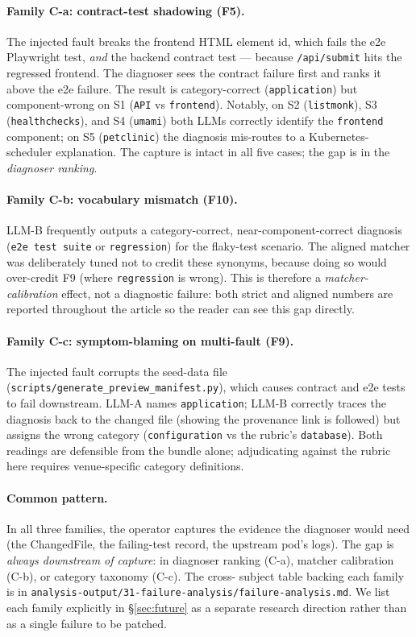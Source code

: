 \documentclass[sigconf, nonacm=true, anonymous=false, review=false]{acmart}
\newcommand{\artifactname}[1]{\nolinkurl{#1}}
\newcommand{\fn}[1]{F#1\xspace}
\begin{document}
\paragraph{Family C-a: contract-test shadowing (\fn{5}).}
The injected fault breaks the frontend HTML element id, which fails
the e2e Playwright test, \emph{and} the backend contract test —
because \texttt{/api/submit} hits the regressed frontend. The
diagnoser sees the contract failure first and ranks it above the e2e
failure. The result is category-correct (\texttt{application}) but
component-wrong on S1 (\texttt{API} vs \texttt{frontend}). Notably,
on S2 (\texttt{listmonk}), S3 (\texttt{healthchecks}), and S4
(\texttt{umami}) both LLMs correctly identify the
\texttt{frontend} component; on S5 (\texttt{petclinic}) the diagnosis
mis-routes to a Kubernetes-scheduler explanation. The capture is
intact in all five cases; the gap is in the \emph{diagnoser ranking}.

\paragraph{Family C-b: vocabulary mismatch (\fn{10}).}
LLM-B frequently outputs a category-correct, near-component-correct
diagnosis (\texttt{e2e test suite} or \texttt{regression}) for the
flaky-test scenario. The aligned matcher was deliberately tuned not
to credit these synonyms, because doing so would over-credit \fn{9}
(where \texttt{regression} is wrong). This is therefore a
\emph{matcher-calibration} effect, not a diagnostic failure: both
strict and aligned numbers are reported throughout the article so the
reader can see this gap directly.

\paragraph{Family C-c: symptom-blaming on multi-fault (\fn{9}).}
The injected fault corrupts the seed-data file
(\texttt{scripts/generate\_preview\_manifest.py}), which causes
contract and e2e tests to fail downstream. LLM-A names
\texttt{application}; LLM-B correctly traces the diagnosis back to
the changed file (showing the provenance link is followed) but
assigns the wrong category (\texttt{configuration} vs the rubric's
\texttt{database}). Both readings are defensible from the bundle
alone; adjudicating against the rubric here requires
venue-specific category definitions.

\paragraph{Common pattern.} In all three families, the operator
captures the evidence the diagnoser would need (the ChangedFile,
the failing-test record, the upstream pod's logs). The gap is
\emph{always downstream of capture}: in diagnoser ranking (C-a),
matcher calibration (C-b), or category taxonomy (C-c). The cross-
subject table backing each family is in
\artifactname{analysis-output/31-failure-analysis/failure-analysis.md}.
We list each family explicitly in \S\ref{sec:future} as a separate
research direction rather than as a single failure to be patched.
\end{document}
